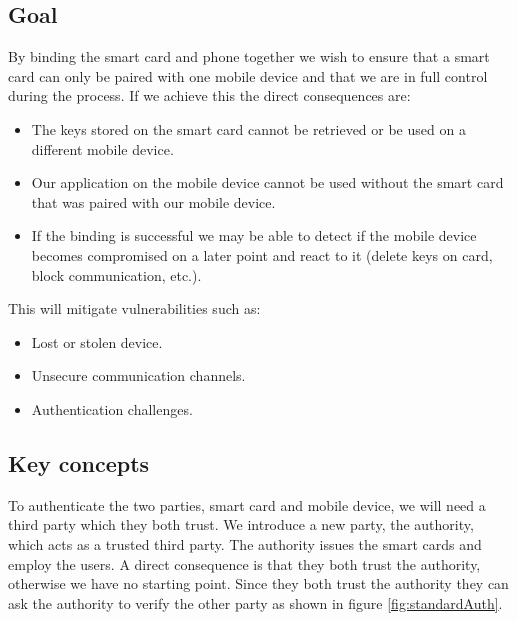 \subsection{Goal}
By binding the smart card and phone together we wish to ensure that a smart card can only be paired with one mobile device and that we are in full control during the process. If we achieve this the direct consequences are:
\begin{itemize}
  \item The keys stored on the smart card cannot be retrieved or be used on a different mobile device.
  \item Our application on the mobile device cannot be used without the smart card that was paired with our mobile device.
  \item If the binding is successful we may be able to detect if the mobile device becomes compromised on a later point and react to it (delete keys on card, block communication, etc.).
\end{itemize}

This will mitigate vulnerabilities such as:
\begin{itemize}
  \item Lost or stolen device.
  \item Unsecure communication channels.
  \item Authentication challenges.
\end{itemize}

\subsection{Key concepts}
To authenticate the two parties, smart card and mobile device, we will need a third party which they both trust. We introduce a new party, the authority, which acts as a trusted third party. The authority issues the smart cards and employ the users. A direct consequence is that they both trust the authority, otherwise we have no starting point. Since they both trust the authority they can ask the authority to verify the other party as shown in figure \ref{fig:standardAuth}.

